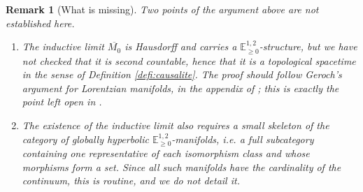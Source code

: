 \documentclass[a4paper,twoside]{article}
\newcommand{\mass}[1]{\mathbb{E}^{1,2}_{#1}}
\newtheorem{rem}[lem]{Remark}
\begin{document}
\begin{rem}[What is missing]\label{rem:CBG_manquant}
Two points of the argument above are not established here.
\begin{enumerate}[label=(\roman*)]
\item The inductive limit $\overline{M_0}$ is Hausdorff and carries a $\mass{\geq0}$-structure, but
we have not checked that it is \emph{second countable}, hence that it is a topological spacetime in
the sense of Definition \ref{defi:causalite}. The proof should follow Geroch's argument for
Lorentzian manifolds, in the appendix of \cite{MR0234703}; this is exactly the point left open in
\cite[Section~3.4]{thesis}.
\item The existence of the inductive limit also requires a small skeleton of the category of
globally hyperbolic $\mass{\geq0}$-manifolds, i.e. a full subcategory containing one representative
of each isomorphism class and whose morphisms form a set. Since all such manifolds have the
cardinality of the continuum, this is routine, and we do not detail it.
\end{enumerate}
\end{rem}

	
	
	\label{LastPage}
\end{document}
